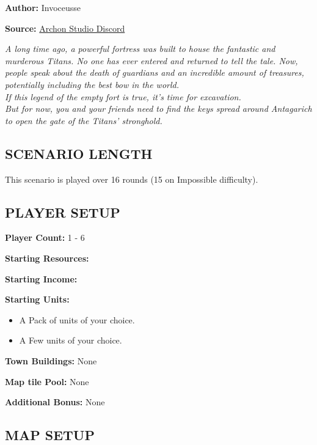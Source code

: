
\begin{multicols*}{2}

\textbf{Author:} Invoceusse

\textbf{Source:} \href{https://discord.com/channels/740870068178649108/1219333721019256943}{Archon Studio Discord}

\textit{A long time ago, a powerful fortress was built to house the fantastic and murderous Titans.
  No one has ever entered and returned to tell the tale.
  Now, people speak about the death of guardians and an incredible amount of treasures, potentially including the best bow in the world.\\
  If this legend of the empty fort is true, it's time for excavation.\\
  But for now, you and your friends need to find the keys spread around Antagarich to open the gate of the Titans' stronghold.
}
\subsection*{\MakeUppercase{Scenario Length}}

This scenario is played over 16 rounds (15 on Impossible difficulty).

\subsection*{\MakeUppercase{Player setup}}

\textbf{Player Count:} 1 - 6

\textbf{Starting Resources:}\par
{}

\textbf{Starting Income:}\par
{}

\textbf{Starting Units:}
\begin{itemize}
  \item A Pack of  units of your choice.
  \item A Few  units of your choice.
\end{itemize}

\textbf{Town Buildings:} None

\textbf{Map tile Pool:} None

\textbf{Additional Bonus:} None

\subsection*{\MakeUppercase{Map Setup}}


\end{multicols*}
